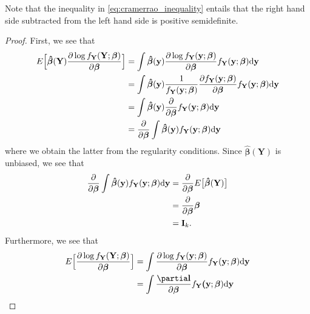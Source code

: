 Note that the inequality in \eqref{eq:cramerrao_inequality} entails that the right hand side subtracted from the left hand side is positive semidefinite.

\begin{proof}
First, we see that
\begin{align*}
    E\Big[\boldsymbol{\hat{\beta}}(\textbf{Y}) \frac{\partial \log f_\textbf{Y}(\textbf{Y};\boldsymbol{\beta})}{\partial \boldsymbol{\beta}} \Big]
    &=\int \boldsymbol{\hat{\beta}}(\textbf{y})\frac{\partial \log f_\textbf{Y}(\textbf{y};\boldsymbol{\beta})}{\partial \boldsymbol{\beta}}f_\textbf{Y}(\textbf{y};\boldsymbol{\beta}) \text{d\textbf{y}} \\
    &= \int \boldsymbol{\hat{\beta}}(\textbf{y})\frac{1}{f_\textbf{Y}(\textbf{y};\boldsymbol{\beta})}\frac{\partial f_\textbf{Y}(\textbf{y};\boldsymbol{\beta})}{\partial \boldsymbol{\beta}}f_\textbf{Y}(\textbf{y}
    ;\boldsymbol{\beta}) \text{d\textbf{y}} \\
    &=\int \boldsymbol{\hat{\beta}}(\textbf{y}) \frac{\partial}{\partial \boldsymbol{\beta}}f_\textbf{Y}(\textbf{y};\boldsymbol{\beta}) \text{d\textbf{y}} \\
    &=\frac{\partial}{\partial \boldsymbol{\beta}} \int \boldsymbol{\hat{\beta}}(\textbf{y}) f_\textbf{Y}(\textbf{y};\boldsymbol{\beta}) \text{d\textbf{y}}
\end{align*}
where we obtain the latter from the regularity conditions. 
Since $\boldsymbol{\hat{\beta}}(\textbf{Y})$ is unbiased, we see that
\begin{align}
    \frac{\partial}{\partial \boldsymbol{\beta}} \int \boldsymbol{\hat{\beta}}(\textbf{y}) f_\textbf{Y}(\textbf{y};\boldsymbol{\beta}) \text{d\textbf{y}} &= \frac{\partial}{\partial\boldsymbol{\beta}} E\big[ \boldsymbol{\hat{\beta}}(\textbf{Y})\big] \nonumber\\
    &= \frac{\partial}{\partial\boldsymbol{\beta}} \boldsymbol{\beta} \nonumber\\
    &= \textbf{I}_{k} \label{eq:cramerraoe2stjerner}.
\end{align}
Furthermore, we see that
\begin{align}
    E\Big[ \frac{\partial \log f_\textbf{Y}(\textbf{Y};\boldsymbol{\beta})}{\partial \boldsymbol{\beta}}\Big] &= \int \frac{\partial \log f_\textbf{Y}(\textbf{y};\boldsymbol{\beta})}{\partial \boldsymbol{\beta}}f_\textbf{Y}(\textbf{y};\boldsymbol{\beta}) \text{d\textbf{y}} \nonumber \\
    &=\int  \frac{\partia\textbf{l}}{\partial \boldsymbol{\beta}}f_\textbf{Y}\textbf{(}\textbf{y};\boldsymbol{\beta}) \text{d\textbf{y}} \nonumber \\

\end{align}
\end{proof}
